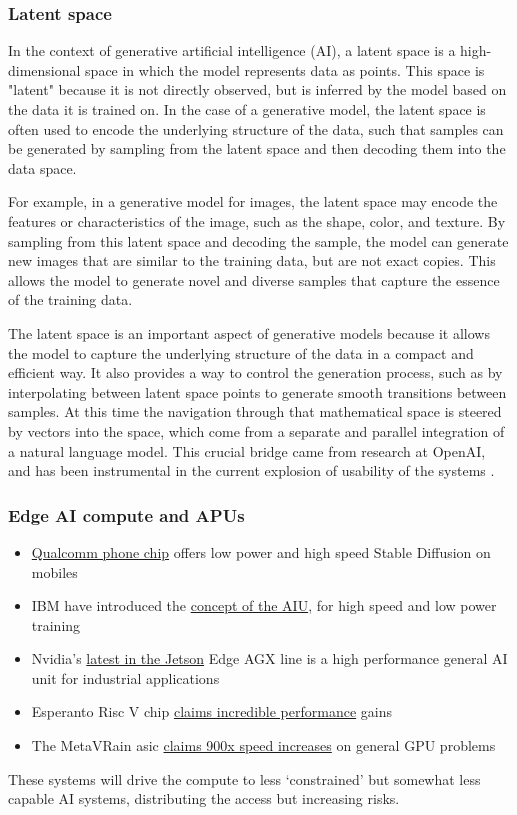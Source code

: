 \subsubsection{Latent space}
In the context of generative artificial intelligence (AI), a latent space is a high-dimensional space in which the model represents data as points. This space is "latent" because it is not directly observed, but is inferred by the model based on the data it is trained on. In the case of a generative model, the latent space is often used to encode the underlying structure of the data, such that samples can be generated by sampling from the latent space and then decoding them into the data space.

For example, in a generative model for images, the latent space may encode the features or characteristics of the image, such as the shape, color, and texture. By sampling from this latent space and decoding the sample, the model can generate new images that are similar to the training data, but are not exact copies. This allows the model to generate novel and diverse samples that capture the essence of the training data.

The latent space is an important aspect of generative models because it allows the model to capture the underlying structure of the data in a compact and efficient way. It also provides a way to control the generation process, such as by interpolating between latent space points to generate smooth transitions between samples. At this time the navigation through that mathematical space is steered by vectors into the space, which come from a separate and parallel integration of a natural language model. This crucial bridge came from research at OpenAI, and has been instrumental in the current explosion of usability of the systems \cite{radford2021learning}.
\subsubsection{Edge AI compute and APUs}
\begin{itemize}
\item \href{https://www.theverge.com/2023/2/23/23611668/ai-image-stable-diffusion-mobile-android-qualcomm-fastest}{Qualcomm phone chip} offers low power and high speed Stable Diffusion on mobiles
\item IBM have introduced the \href{https://research.ibm.com/blog/ibm-artificial-intelligence-unit-aiu}{concept of the AIU}, for high speed and low power training
\item Nvidia's \href{https://www.okdo.com/p/nvidia-jetson-agx-orin-64gb-developer-kit/}{latest in the Jetson} Edge AGX line is a high performance general AI unit for industrial applications
\item Esperanto Risc V chip \href{https://www.esperanto.ai/News/risc-v-startup-esperanto-technologies-samples-first-ai-silicon/}{claims incredible performance} gains
\item The MetaVRain asic \href{https://hdh4797.wixsite.com/dhan/project-1}{claims 900x speed increases} on general GPU problems
\end{itemize}
 These systems will drive the compute to less `constrained' but somewhat less capable AI systems, distributing the access but increasing risks.
